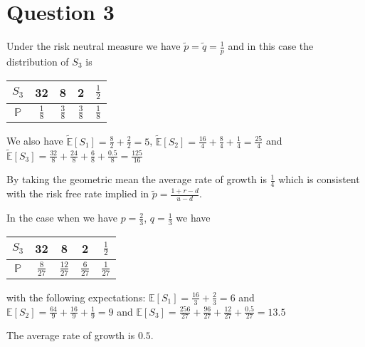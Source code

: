\documentclass{unswmaths}
\begin{document}
\section*{Question 3}
Under the risk neutral measure we have $ \tilde{p} = \tilde{q} = \frac{1}{p} $
and in this case the distribution of $ S_3 $ is
\begin{tabular}[h]{c|cccc}
$ S_3 $ & 32 & 8 & 2 & $ \frac{1}{2} $\\
\hline
$ \mathbb{P} $ & $ \frac{1}{8} $ & $ \frac{3}{8} $ & $ \frac{3}{8} $ & $ \frac{1}{8} $
\end{tabular}

We also have $ \tilde{\mathbb{E}}[S_1] = \frac{8}{2} + \frac{2}{2} = 5 $, $  \tilde{\mathbb{E}}[S_2] = \frac{16}{4} + \frac{8}{4} + \frac{1}{4} = \frac{25}{4} $
and  $ \tilde{\mathbb{E}}[S_3] = \frac{32}{8} + \frac{24}{8} + \frac{6}{8} + \frac{0.5}{8} = \frac{125}{16}$

By taking the geometric mean the average rate of growth is $ \frac{1}{4} $ which is consistent
with the risk free rate implied in $ \tilde{p} = \frac{1+r-d}{u-d} $.

In the case when we have $ p = \frac{2}{3} $, $ q = \frac{1}{3} $ we have

\begin{tabular}[h]{c|cccc}
$ S_3 $ & 32 & 8 & 2 & $ \frac{1}{2} $\\
\hline
$ \mathbb{P} $ & $ \frac{8}{27} $ & $ \frac{12}{27} $ & $ \frac{6}{27} $ & $ \frac{1}{27} $
\end{tabular}

with the following expectations:
$ \mathbb{E}[S_1] = \frac{16}{3} + \frac{2}{3} = 6 $ and $ \mathbb{E}[S_2] = \frac{64}{9} + \frac{16}{9} + \frac{1}{9} = 9 $
and $ \mathbb{E}[S_3] = \frac{256}{27} + \frac{96}{27} + \frac{12}{27} + \frac{0.5}{27} = 13.5 $ 

The average rate of growth is $ 0.5 $.
\end{document}
